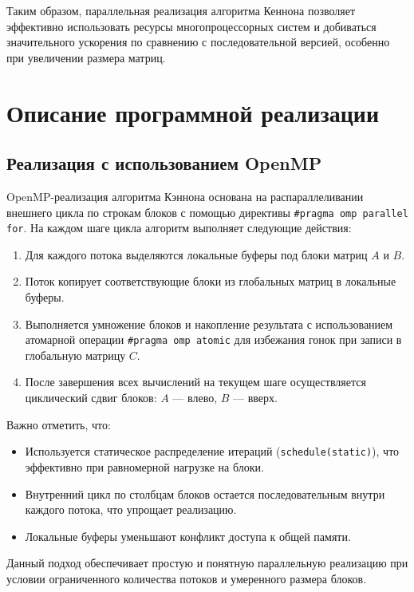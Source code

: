 \documentclass[12pt]{article}
\begin{document}
Таким образом, параллельная реализация алгоритма Кеннона позволяет эффективно использовать ресурсы многопроцессорных систем и добиваться значительного ускорения по сравнению с последовательной версией, особенно при увеличении размера матриц.

\newpage
\section*{Описание программной реализации}

\subsection*{Реализация с использованием OpenMP}

OpenMP-реализация алгоритма Кэннона основана на распараллеливании внешнего цикла по строкам блоков с помощью директивы \texttt{\#pragma omp parallel for}. На каждом шаге цикла алгоритм выполняет следующие действия:

\begin{enumerate}
    \item Для каждого потока выделяются локальные буферы под блоки матриц \( A \) и \( B \).
    \item Поток копирует соответствующие блоки из глобальных матриц в локальные буферы.
    \item Выполняется умножение блоков и накопление результата с использованием атомарной операции \texttt{\#pragma omp atomic} для избежания гонок при записи в глобальную матрицу \( C \).
    \item После завершения всех вычислений на текущем шаге осуществляется циклический сдвиг блоков: \( A \) — влево, \( B \) — вверх.
\end{enumerate}

Важно отметить, что:
\begin{itemize}
    \item Используется статическое распределение итераций (\texttt{schedule(static)}), что эффективно при равномерной нагрузке на блоки.
    \item Внутренний цикл по столбцам блоков остается последовательным внутри каждого потока, что упрощает реализацию.
    \item Локальные буферы уменьшают конфликт доступа к общей памяти.
\end{itemize}

Данный подход обеспечивает простую и понятную параллельную реализацию при условии ограниченного количества потоков и умеренного размера блоков.
\end{document}
